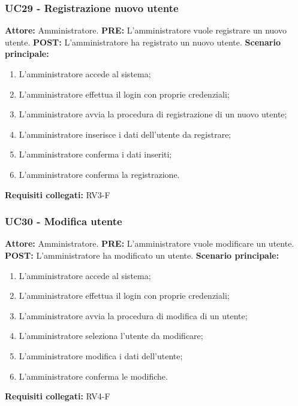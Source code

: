\documentclass[a4paper, 12pt]{article}
\begin{document}
\subsubsection{UC29 - Registrazione nuovo utente}
\textbf{Attore: } Amministratore.\newline
\textbf{PRE: } L'amministratore vuole registrare un nuovo utente.\newline
\textbf{POST: } L'amministratore ha registrato un nuovo utente.\newline
\textbf{Scenario principale: }
\begin{enumerate}
    \item L'amministratore accede al sistema;
    \item L'amministratore effettua il login con proprie credenziali;
    \item L'amministratore avvia la procedura di registrazione di un nuovo utente;
    \item L'amministratore inserisce i dati dell'utente da registrare;
    \item L'amministratore conferma i dati inseriti;
    \item L'amministratore conferma la registrazione.
\end{enumerate}
\textbf{Requisiti collegati: } RV3-F\newline

\subsubsection{UC30 - Modifica utente}
\textbf{Attore: } Amministratore.\newline
\textbf{PRE: } L'amministratore vuole modificare un utente.\newline
\textbf{POST: } L'amministratore ha modificato un utente.\newline
\textbf{Scenario principale: }
\begin{enumerate}
    \item L'amministratore accede al sistema;
    \item L'amministratore effettua il login con proprie credenziali;
    \item L'amministratore avvia la procedura di modifica di un utente;
    \item L'amministratore seleziona l'utente da modificare;
    \item L'amministratore modifica i dati dell'utente;
    \item L'amministratore conferma le modifiche.
\end{enumerate}
\textbf{Requisiti collegati: } RV4-F\newline
\end{document}
